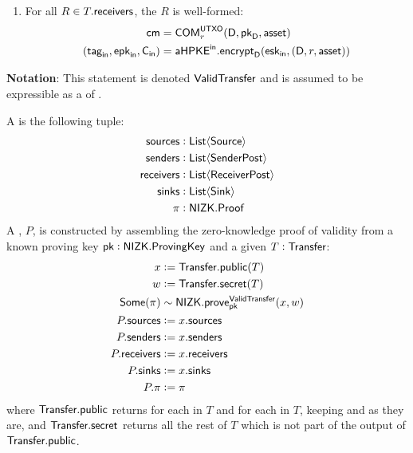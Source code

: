 \begin{definition}
\begin{enumerate}
        \item For all $R \in T.{\textsf{receivers}}$, the \Receiver{} $R$ is well-formed:
            \begin{align*}
                {\textsf{cm}}            &= {\textsf{COM}}^{{\textsf{UTXO}}}_{r}(\textsf{D}, {{\textsf{pk}}_\textsf{D}}, {\textsf{asset}}) \\
                ({{\textsf{tag}}_\textsf{in}}, {{\textsf{epk}}_\textsf{in}}, {\textsf{C}_\textsf{in}}) &= {{\textsf{aHPKE}}^\textsf{in}}.{\textsf{encrypt}}_\textsf{D}({{\textsf{esk}}_\textsf{in}}, (\textsf{D}, r, {\textsf{asset}}))
            \end{align*}
    \end{enumerate}
    \textbf{Notation}: This statement is denoted ${\textsf{ValidTransfer}}$ and is assumed to be expressible as a \Statement{} of \NIZK{}.
\end{definition}

\begin{definition}
    A \TransferPost{} is the following tuple:
    \begin{align*}
        {\textsf{sources}}    &: {\textsf{List}}\langle{{\textsf{Source}}}\rangle \\
        {\textsf{senders}}    &: {\textsf{List}}\langle{{\textsf{SenderPost}}}\rangle \\
        {\textsf{receivers}}  &: {\textsf{List}}\langle{{\textsf{ReceiverPost}}}\rangle \\
        {\textsf{sinks}}      &: {\textsf{List}}\langle{{\textsf{Sink}}}\rangle \\
        \pi         &: {\textsf{NIZK}}.{\textsf{Proof}} 
    \end{align*}
    A \TransferPost{}, $P$, is constructed by assembling the zero-knowledge proof of \Transfer{} validity from a known proving key ${\textsf{pk}} : {\textsf{NIZK}}.{\textsf{ProvingKey}}$ and a given $T : {\textsf{Transfer}}$:
    \begin{align*}
        x             &:= {\textsf{Transfer}}.{\textsf{public}}(T) \\
        w             &:= {\textsf{Transfer}}.{\textsf{secret}}(T) \\
        {\textsf{Some}}(\pi)    &\sim {\textsf{NIZK}}.{\textsf{prove}}^{\textsf{ValidTransfer}}_{\textsf{pk}}(x, w) \\
        P.{\textsf{sources}}    &:= x.{\textsf{sources}} \\
        P.{\textsf{senders}}    &:= x.{\textsf{senders}} \\
        P.{\textsf{receivers}}  &:= x.{\textsf{receivers}} \\
        P.{\textsf{sinks}}      &:= x.{\textsf{sinks}} \\
        P.\pi         &:= \pi
    \end{align*}
    where ${\textsf{Transfer}}.{\textsf{public}}$ returns  for each \Sender{} in $T$ and  for each \Receiver{} in $T$, keeping  and  as they are, and ${\textsf{Transfer}}.{\textsf{secret}}$ returns all the rest of $T$ which is not part of the output of ${\textsf{Transfer}}.{\textsf{public}}$.
\end{definition}

